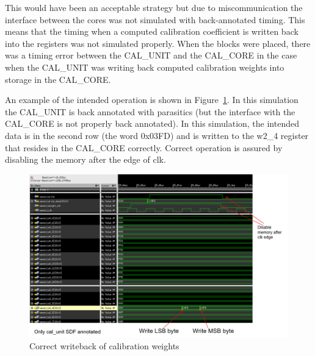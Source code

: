 This would have been an acceptable strategy but due to miscommunication the interface between the cores was not simulated with back-annotated timing. This means that the timing when a computed calibration coefficient is written back into the registers was not simulated properly. When the blocks were placed, there was a timing error between the CAL\_UNIT and the CAL\_CORE in the case when the CAL\_UNIT was writing back computed calibration weights into storage in the CAL\_CORE.

An example of the intended operation is shown in Figure~\ref{fig:correctcalwrite}. In this simulation the CAL\_UNIT is back annotated with parasitics (but the interface with the CAL\_CORE is not properly back annotated). In this simulation, the intended data is in the second row (the word 0x03FD) and is written to the w2\_4 register that resides in the CAL\_CORE correctly. Correct operation is assured by disabling the memory after the edge of clk.
\begin{figure}[h]
\centering
\begin{center}
\includegraphics[width=1.0\textwidth]{figures/CorrectCalWrite.png}
\end{center}
\caption{Correct writeback of calibration weights}
\label{fig:correctcalwrite}
\end{figure}

